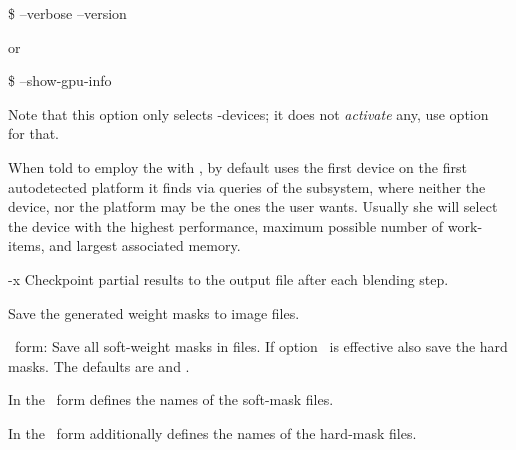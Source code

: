 \begin{codelist}
  \begin{terminal}
    \$ \app{} --verbose --version
  \end{terminal}
  or
  \begin{terminal}
    \$ \app{} --show-gpu-info
  \end{terminal}

  Note that this option only selects -devices; it does not \emph{activate} any, use
  option~ for that.

  When told to employ the  with , by default \App{} uses the first
  device on the first autodetected platform it finds via queries of the 
  subsystem, where neither the device, nor the platform may be the ones the user wants.  Usually
  she will select the device with the highest performance, maximum possible number of
  work-items, and largest associated memory.


\ifenblend
    \label{opt:x}%
  \item[-x]
    Checkpoint partial results to the output
    file after each blending step.
\fi


\ifenfuse
    \label{opt:save-masks}%
  \item[\itempar{--save-masks~\textrm{(\oldstylefirst~form)}
      \\ --save-masks=\metavar{SOFT-MASK-TEMPLATE}~\textrm{(\oldstylesecond~form)}
      \\ --save-masks=\metavar{SOFT-MASK-TEMPLATE}:\feasiblebreak
      \metavar{HARD-MASK-TEMPLATE}~\textrm{(\oldstylethird~form)}}]\itemend
    Save the generated weight masks to image
    files.

    \begin{sloppypar}
      \oldstylefirst~form: Save all soft-weight masks in files.  If
      option~ is effective also save the hard
      masks.  The defaults are  and
      .

      In the \oldstylesecond~form  defines the names of
      the soft-mask files.

      In the \oldstylethird~form  additionally defines the
      names of the hard-mask files.
    \end{sloppypar}


\end{codelist}
